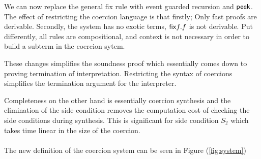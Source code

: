We can now replace the general fix rule with event guarded recursion and $\mathsf{peek}$. The effect of restricting the coercion language is that firstly; Only fast proofs are derivable. Secondly, the system has no exotic terms, $\mathsf{fix} f. f$ is not derivable. Put differently, all rules are compositional, and context is not necessary in order to build a subterm in the coercion sytem. 

These changes simplifies the soundness proof which essentially comes down to proving termination of interpretation. Restricting the syntax of coercions simplifies the termination argument for the interpreter. 

Completeness on the other hand is essentially coercion synthesis and the elimination of the side condition removes the computation cost of checking the side conditions during synthesis. This is significant for side condition $S_2$ which takes time linear in the size of the coercion.\\\\
The new definition of the coercion system can be seen in Figure (\ref{fig:system})
